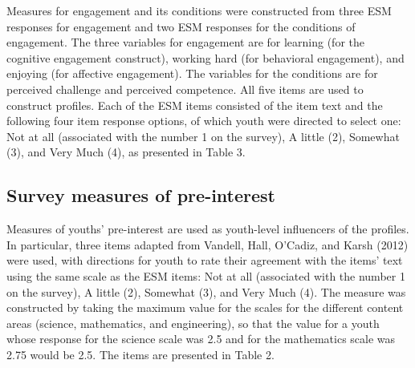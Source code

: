\documentclass[]{book}
\theoremstyle{definition}
\theoremstyle{definition}
\theoremstyle{definition}
\theoremstyle{remark}
\begin{document}
Measures for engagement and its conditions were constructed from three
ESM responses for engagement and two ESM responses for the conditions of
engagement. The three variables for engagement are for learning (for the
cognitive engagement construct), working hard (for behavioral
engagement), and enjoying (for affective engagement). The variables for
the conditions are for perceived challenge and perceived competence. All
five items are used to construct profiles. Each of the ESM items
consisted of the item text and the following four item response options,
of which youth were directed to select one: Not at all (associated with
the number 1 on the survey), A little (2), Somewhat (3), and Very Much
(4), as presented in Table 3.

\begin{table}

\caption{\label{tab:unnamed-chunk-4}ESM measures for profiles}
\centering
{}
\end{table}

\subsection{Survey measures of
pre-interest}\label{survey-measures-of-pre-interest}

Measures of youths' pre-interest are used as youth-level influencers of
the profiles. In particular, three items adapted from Vandell, Hall,
O'Cadiz, and Karsh (2012) were used, with directions for youth to rate
their agreement with the items' text using the same scale as the ESM
items: Not at all (associated with the number 1 on the survey), A little
(2), Somewhat (3), and Very Much (4). The measure was constructed by
taking the maximum value for the scales for the different content areas
(science, mathematics, and engineering), so that the value for a youth
whose response for the science scale was 2.5 and for the mathematics
scale was 2.75 would be 2.5. The items are presented in Table 2.
\end{document}
